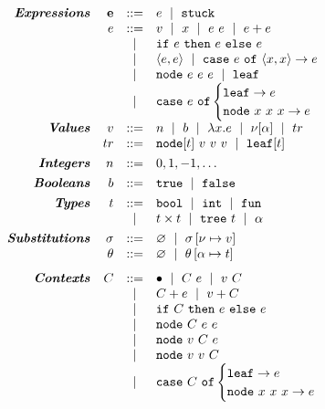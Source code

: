 \begin{figure}
$$
\begin{array}{rrcl}

\emphbf{Expressions}
  & \estuck & ::= & e \spmid \stuck \\
  & e & ::=    & v \spmid x \spmid \eapp{e}{e} \spmid \eplus{e}{e}\\
  &   & \spmid & \eif{e}{e}{e} \\
  &   & \spmid & \epair{e}{e} \spmid \epcase{e}{x}{x}{e} \\
  &   & \spmid & \enode{e}{e}{e} \spmid \eleaf \\
  &   & \spmid & \ecase{e}{e}{x}{x}{x}{e} \\[0.1in]

\emphbf{Values}
  & v  & ::= & n \spmid b \spmid \efun{x}{e} \spmid \vhole{\thole} \spmid tr \\
  & tr & ::= & \vnode{t}{v}{v}{v} \spmid \vleaf{t} \\[0.05in]

\emphbf{Integers}
  & n & ::= &  0,1,-1,\ldots \\[0.05in]

\emphbf{Booleans}
  & b & ::= &  \etrue \spmid \efalse \\[0.05in]

\emphbf{Types}
  & t & ::=     & \tbool \spmid \tint \spmid \tfun \\
  &   &  \spmid & \tprod{t}{t} \spmid \ttree{t} \spmid \thole \\[0.05in]

\emphbf{Substitutions}
  & \vsu & ::= & \emptysu \spmid \extendsu{\vsu}{\ehole}{v} \\
  & \tsu & ::= & \emptysu \spmid \extendsu{\tsu}{\thole}{t} \\[0.1in]
\emphbf{Contexts}
  & C
  & ::=
  &   	 \bullet
  \spmid \eapp{C}{e}
  \spmid \eapp{v}{C} \\
  & & \spmid & \eplus{C}{e} \spmid \eplus{v}{C} \\
  & & \spmid & \eif{C}{e}{e} \\
  & & \spmid & \enode{C}{e}{e} \\
  & & \spmid & \enode{v}{C}{e} \\
  & & \spmid & \enode{v}{v}{C} \\
  & & \spmid & \ecase{C}{e}{x}{x}{x}{e}
  \\[0.05in]
\end{array}
$$


\end{figure}
